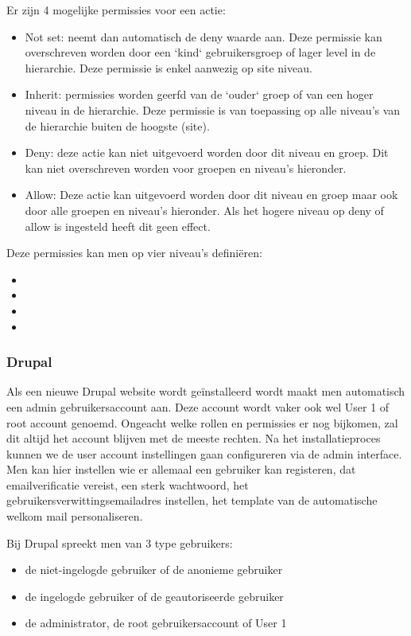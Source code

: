 Er zijn 4 mogelijke permissies voor een actie:
\begin{itemize}
    \item Not set: neemt dan automatisch de deny waarde aan. Deze permissie kan overschreven worden door een `kind` gebruikersgroep of lager level in de hierarchie. Deze permissie is enkel aanwezig op site niveau.
    \item Inherit: permissies worden geerfd van de `ouder` groep of van een hoger niveau in de hierarchie. Deze permissie is van toepassing op alle niveau's van de hierarchie buiten de hoogste (site).
    \item Deny: deze actie kan niet uitgevoerd worden door dit niveau en groep. Dit kan niet overschreven worden voor groepen en niveau's hieronder.
    \item Allow: Deze actie kan uitgevoerd worden door dit niveau en groep maar ook door alle groepen en niveau's hieronder. Als het hogere niveau op deny of allow is ingesteld heeft dit geen effect.
\end{itemize}

Deze permissies kan men op vier niveau's definiëren:
\begin{itemize}
\item
\item 
\item 
\item 
\end{itemize}

\subsubsection{Drupal}
Als een nieuwe Drupal website wordt geïnstalleerd wordt maakt men automatisch een admin gebruikersaccount aan. Deze account wordt vaker ook wel User 1 of root account genoemd. Ongeacht welke rollen en permissies er nog bijkomen, zal dit altijd het account blijven met de meeste rechten. Na het installatieproces kunnen we de user account instellingen gaan configureren via de admin interface. Men kan hier instellen wie er allemaal een gebruiker kan registeren, dat emailverificatie vereist, een sterk wachtwoord, het gebruikersverwittingsemailadres instellen, het template van de automatische welkom mail personaliseren.

Bij Drupal spreekt men van 3 type gebruikers:
\begin{itemize}
	\item de niet-ingelogde gebruiker of de anonieme gebruiker
	\item de ingelogde gebruiker of de geautoriseerde gebruiker
	\item de administrator, de root gebruikersaccount of User 1
\end{itemize}

